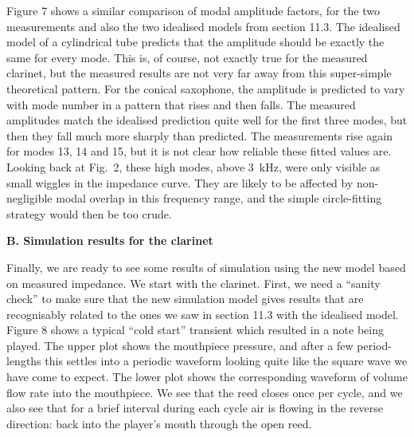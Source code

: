   Figure 7 shows a similar comparison of modal amplitude factors, for the two 
  measurements and also the two idealised models from section 11.3. The 
  idealised model of a cylindrical tube predicts that the amplitude should be 
  exactly the same for every mode. This is, of course, not exactly true for the 
  measured clarinet, but the measured results are not very far away from this 
  super-simple theoretical pattern. For the conical saxophone, the amplitude is 
  predicted to vary with mode number in a pattern that rises and then falls. 
  The measured amplitudes match the idealised prediction quite well for the 
  first three modes, but then they fall much more sharply than predicted. The 
  measurements rise again for modes 13, 14 and 15, but it is not clear how 
  reliable these fitted values are. Looking back at Fig.\ 2, these high modes, 
  above 3~kHz, were only visible as small wiggles in the impedance curve. They 
  are likely to be affected by non-negligible modal overlap in this frequency 
  range, and the simple circle-fitting strategy would then be too crude. 


  \textbf{B. Simulation results for the clarinet} 

  Finally, we are ready to see some results of simulation using the new model 
  based on measured impedance. We start with the clarinet. First, we need a 
  “sanity check” to make sure that the new simulation model gives results that 
  are recognisably related to the ones we saw in section 11.3 with the 
  idealised model. Figure 8 shows a typical “cold start” transient which 
  resulted in a note being played. The upper plot shows the mouthpiece 
  pressure, and after a few period-lengths this settles into a periodic 
  waveform looking quite like the square wave we have come to expect. The lower 
  plot shows the corresponding waveform of volume flow rate into the 
  mouthpiece. We see that the reed closes once per cycle, and we also see that 
  for a brief interval during each cycle air is flowing in the reverse 
  direction: back into the player’s mouth through the open reed. 

